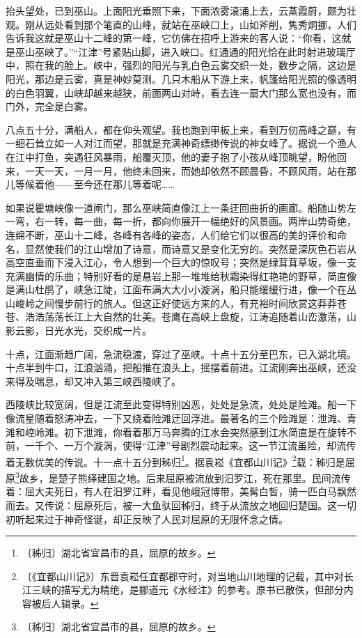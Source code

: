 \documentclass[12pt,UTF-8,openany]{ctexbook}
\begin{document}
\begin{large}
    抬头望处，已到巫山。上面阳光垂照下来，下面浓雾滚涌上去，云蒸霞蔚，颇为壮观。刚从远处看到那个笔直的山峰，就站在巫峡口上，山如斧削，隽秀炯挪，人们告诉我这就是巫山十二峰的第一峰，它仿佛在招呼上游来的客人说：“你看，这就是巫山巫峡了。”“江津”号紧贴山脚，进入峡口。红通通的阳光恰在此时射进玻璃厅中，照在我的脸上。峡中，强烈的阳光与乳白色云雾交织一处，数步之隔，这边是阳光，那边是云雾，真是神妙莫测。几只木船从下游上来，帆篷给阳光照的像透明的白色羽翼，山峡却越来越狭，前面两山对峙，看去连一扇大门那么宽也没有，而门外，完全是白雾。
    
    八点五十分，满船人，都在仰头观望。我也跑到甲板上来，看到万仞高峰之巅，有一细石耸立如一人对江而望，那就是充满神奇缥缈传说的神女峰了。据说一个渔人在江中打鱼，突遇狂风暴雨，船覆灭顶，他的妻子抱了小孩从峰顶眺望，盼他回来，一天一天，一月一月，他终未回来，而她却依然不顾晨昏，不顾风雨，站在那儿等候着他——至今还在那儿等着呢……
    
    如果说瞿塘峡像一道闸门，那么巫峡简直像江上一条迂回曲折的画廊。船随山势左一弯，右一转，每一曲，每一折，都向你展开一幅绝好的风景画。两岸山势奇绝，连绵不断，巫山十二峰，各峰有各峰的姿态，人们给它们以很高的美的评价和命名，显然使我们的江山增加了诗意，而诗意又是变化无穷的。突然是深灰色石岩从高空直垂而下浸入江心，令人想到一个巨大的惊叹号；突然是绿茸茸草坂，像一支充满幽情的乐曲；特别好看的是悬岩上那一堆堆给秋霜染得红艳艳的野草，简直像是满山杜鹃了，峡急江陡，江面布满大大小小漩涡，船只能缓缓行进，像一个在丛山峻岭之间慢步前行的旅人。但这正好使远方来的人，有充裕时间欣赏这莽莽苍苍、浩浩荡荡长江上大自然的壮美。苍鹰在高峡上盘旋，江涛追随着山峦激荡，山影云影，日光水光，交织成一片。
    
    十点，江面渐趋广阔，急流稳渡，穿过了巫峡。十点十五分至巴东，已入湖北境。十点半到牛口，江浪汹涌，把船推在浪头上，摇摆着前进。江流刚奔出巫峡，还没来得及喘息，却又冲入第三峡西陵峡了。
    
    西陵峡比较宽阔，但是江流至此变得特别凶恶，处处是急流，处处是险滩。船一下像流星随着怒涛冲去，一下又绕着险滩迂回浮进。最著名的三个险滩是：泄滩、青滩和崆岭滩。初下泄滩，你看着那万马奔腾的江水会突然感到江水简直是在旋转不前，一千个、一万个漩涡，使得“江津”号剧烈震动起来。这一节江流虽险，却流传着无数优美的传说。十一点十五分到秭归\footnote{〔秭归〕湖北省宜昌市的县，屈原的故乡。}。据袁崧《宜都山川记》\footnote{〔《宜都山川记》〕东晋袁崧任宜都郡守时，对当地山川地理的记载，其中对长江三峡的描写尤为精绝，是郦道元《水经注》的参考。原书已散佚，但部分内容被后人辑录。}载：秭归是屈原\footnote{〔秭归〕湖北省宜昌市的县，屈原的故乡。}故乡，是楚子熊绎建国之地。后来屈原被流放到汨罗江，死在那里。民间流传着：屈大夫死日，有人在汨罗江畔，看见他峨冠博带，美髯白皙，骑一匹白马飘然而去。又传说：屈原死后，被一大鱼驮回秭归，终于从流放之地回归楚国。这一切初听起来过于神奇怪诞，却正反映了人民对屈原的无限怀念之情。
    

\end{large}
\end{document}
